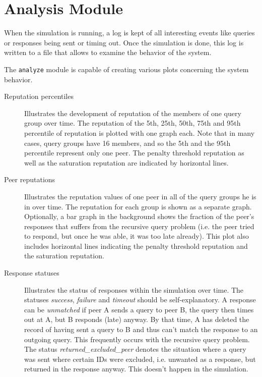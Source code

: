 \section{Analysis Module}
When the simulation is running, a log is kept of all interesting events like
queries or responses being sent or timing out. Once the simulation is done, this
log is written to a file that allows to examine the behavior of the system.

The \texttt{analyze} module is capable of creating various plots concerning the
system behavior.
\begin{description}
\item[Reputation percentiles] Illustrates the development of reputation of the
members of one query group over time. The reputation of the 5th, 25th, 50th,
75th and 95th percentile of reputation is plotted with one graph each. Note that
in many cases, query groups have 16 members, and so the 5th and the 95th
percentile represent only one peer. The penalty threshold reputation as well as
the saturation reputation are indicated by horizontal lines.
\item[Peer reputations] Illustrates the reputation values of one peer in all of
the query groups he is in over time. The reputation for each group is shown as a
separate graph. Optionally, a bar graph in the background shows the fraction of
the peer's responses that suffers from the recursive query problem (i.e. the
peer tried to respond, but once he was able, it was too late already). This plot
also includes horizontal lines indicating the penalty threshold reputation and
the saturation reputation.
\item[Response statuses] Illustrates the status of responses within the
simulation over time. The statuses \emph{success}, \emph{failure} and
\emph{timeout} should be self-explanatory. A response can be \emph{unmatched} if
peer A sends a query to peer B, the query then times out at A, but B responds
(late) anyway. By that time, A has deleted the record of having sent a query to
B and thus can't match the response to an outgoing query. This frequently occurs
with the recursive query problem. The status \emph{returned\_excluded\_peer}
denotes the situation where a query was sent where certain IDs were excluded,
i.e.  unwanted as a response, but returned in the response anyway. This doesn't
happen in the simulation.
\end{description}
